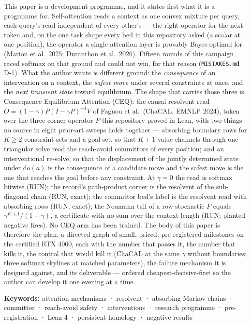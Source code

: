 \documentclass[11pt,a4paper]{article}
\theoremstyle{plain}
\theoremstyle{definition}
\theoremstyle{remark}
\begin{document}
This paper is a development programme, and it states first what it is a
programme for. Self-attention reads a context as one convex mixture per
query, each query's read independent of every other's --- the right
operator for the next token and, on the one task shape every bed in this
repository asked (a scalar at one position), the operator a single
attention layer is provably Bayes-optimal for (Marion et al.~2025;
Duranthon et al.~2026). Fifteen rounds of this campaign raced softmax on
that ground and could not win, for that reason (\texttt{MISTAKES.md}
D-1). What the author wants is different ground: the \emph{consequence}
of an intervention on a context, the \emph{safest move} under several
constraints at once, and the \emph{next transient state} toward
equilibrium. The shape that carries those three is
Consequence-Equilibrium Attention (CEQ): the causal resolvent read
\(O=(1-\gamma)P(I-\gamma P)^{-1}V\) of Fagnou et al.~(ChaCAL, EMNLP
2024), taken over the three-corner operator \(P\) this repository proved
in Lean, with two things no source in eight prior-art sweeps holds
together --- absorbing boundary rows for \(K\ge 2\) constraint sets and
a goal set, so that \(K+1\) value channels through one triangular solve
read the reach-avoid committors of every position; and an interventional
re-solve, so that the displacement of the jointly determined state under
\(\mathrm{do}(a)\) is the consequence of a candidate move and the safest
move is the one that reaches the goal before any constraint. At
\(\gamma=0\) the read is softmax bitwise (RUN); the record's
path-product corner is the resolvent of the sub-diagonal chain (RUN,
exact); the committor bed's label is the resolvent read with absorbing
rows (RUN, exact); the Neumann tail of a row-stochastic \(P\) equals
\(\gamma^{K+1}/(1-\gamma)\), a certificate with no sum over the context
length (RUN; planted negative fires). No CEQ arm has been trained. The
body of this paper is therefore the plan: a directed graph of small,
priced, pre-registered milestones on the certified RTX 4060, each with
the number that passes it, the number that kills it, the control that
would kill it (ChaCAL at the same \(\gamma\) without boundaries; three
softmax skylines at matched parameters), the failure mechanism it is
designed against, and its deliverable --- ordered
cheapest-decisive-first so the author can develop it one evening at a
time.

\textbf{Keywords:} attention mechanisms · resolvent · absorbing Markov
chains · committor · reach-avoid safety · interventions · research
programme · pre-registration · Lean 4 · persistent homology · negative
results
\end{document}

